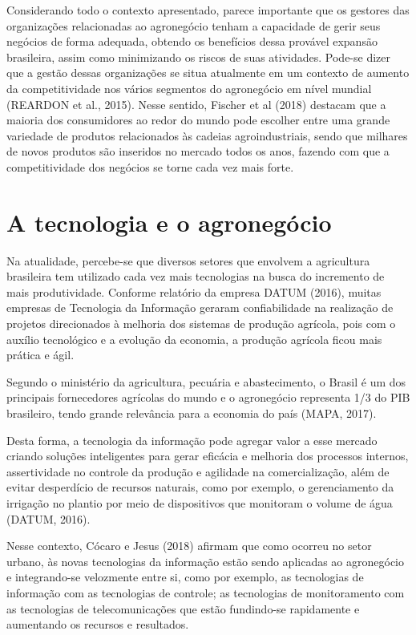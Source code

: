 \documentclass[eso]{bcc}
\begin{document}
Considerando  todo  o  contexto  apresentado,  parece  importante  que  os  gestores  das 
organizações  relacionadas  ao  agronegócio  tenham  a  capacidade  de  gerir seus negócios 
de forma adequada, obtendo os benefícios dessa provável expansão brasileira, assim como 
minimizando os riscos de suas atividades. Pode-se dizer que a gestão dessas organizações 
se situa atualmente em um contexto de aumento da competitividade nos vários segmentos do 
agronegócio em nível mundial (REARDON et al., 2015). Nesse sentido, Fischer et al (2018) destacam 
que  a  maioria  dos  consumidores  ao  redor  do  mundo  pode  escolher  entre uma grande 
variedade de produtos relacionados às cadeias agroindustriais, sendo que milhares de novos 
produtos são inseridos no mercado todos os anos, fazendo com que a competitividade dos negócios 
se torne cada vez mais forte.

\section{A tecnologia e o agronegócio}
Na atualidade, percebe-se  que diversos setores que envolvem a agricultura brasileira tem utilizado 
cada vez mais tecnologias na busca do incremento de mais produtividade. Conforme relatório da 
empresa DATUM (2016), muitas empresas de Tecnologia da Informação geraram confiabilidade na realização 
de projetos direcionados à melhoria dos sistemas de produção agrícola, pois com o auxílio tecnológico 
e a evolução da economia, a produção agrícola ficou mais prática e ágil.

Segundo o ministério da agricultura, pecuária e abastecimento, o Brasil é um dos principais 
fornecedores agrícolas do mundo e o agronegócio representa 1/3 do PIB brasileiro, tendo grande 
relevância para a economia do país (MAPA, 2017).

Desta forma, a tecnologia da informação pode agregar valor a esse mercado criando soluções 
inteligentes para gerar eficácia e melhoria dos processos internos, assertividade no controle da 
produção e agilidade na comercialização, além de evitar desperdício de recursos naturais, como 
por exemplo, o gerenciamento da irrigação no plantio por meio de dispositivos que monitoram o 
volume de água (DATUM, 2016).

Nesse contexto, Cócaro e Jesus (2018) afirmam que como ocorreu no setor urbano, às novas 
tecnologias da informação estão sendo aplicadas ao agronegócio e integrando-se velozmente entre si, 
como por exemplo, as tecnologias de informação com as tecnologias de controle; as tecnologias de 
monitoramento com as tecnologias de telecomunicações que estão fundindo-se rapidamente e aumentando 
os recursos e resultados.
\end{document}
